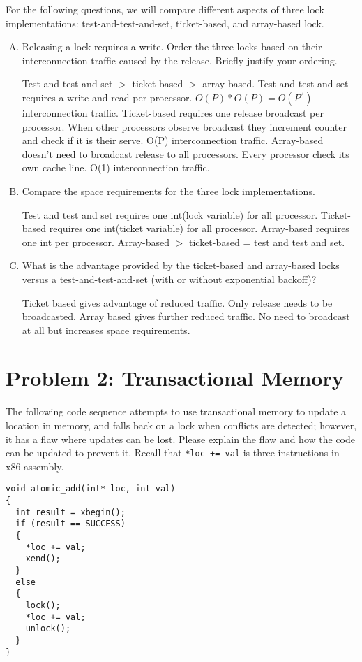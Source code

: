 \documentclass[11pt]{article}
\newenvironment{choice}{\begin{enumerate}[A.]}{\end{enumerate}}
\newenvironment{answer}{\begin{minipage}[c][1.5in]{\textwidth}}{\end{minipage}}
\begin{document}
For the following questions, we will compare different aspects of three
lock implementations:
test-and-test-and-set, ticket-based, and array-based lock.
\begin{choice}
\item Releasing a lock requires a write.  Order the three locks based on their
interconnection traffic caused by the release.  Briefly justify your ordering.

\begin{answer}
Test-and-test-and-set $>$ ticket-based $>$ array-based.
Test and test and set requires a write and read per processor.
$O(P) * O(P) = O(P^2)$ interconnection traffic.
Ticket-based requires one release broadcast per processor.
When other processors observe broadcast they increment counter and check if it is their serve.
O(P) interconnection traffic.
Array-based doesn't need to broadcast release to all processors. 
Every processor check its own cache line.
O(1) interconnection traffic.
\end{answer}

\item Compare the space requirements for the three lock implementations.

\begin{answer}
Test and test and set requires one int(lock variable) for all processor.
Ticket-based requires one int(ticket variable) for all processor.
Array-based requires  one int per processor. 
Array-based $>$ ticket-based = test and test and set.
\end{answer}
\item What is the advantage provided by the ticket-based and array-based locks versus a 
test-and-test-and-set (with or without exponential backoff)?

\begin{answer}
Ticket based gives advantage of reduced traffic. Only release needs to be broadcasted.
Array based gives further reduced traffic. No need to broadcast at all but increases space requirements.
\end{answer}
\end{choice}
\newpage 

\section*{Problem 2: Transactional Memory}

The following code sequence attempts to use transactional memory to update
a location in memory, and falls back on a lock when conflicts are detected; however,
it has a flaw where updates can be lost.  Please
explain the flaw and how the code can be updated to prevent it.  Recall that \verb!*loc += val!
is three instructions in x86 assembly.
\begin{verbatim}
void atomic_add(int* loc, int val)
{
  int result = xbegin();
  if (result == SUCCESS)
  {
    *loc += val;
    xend();
  }
  else
  {
    lock();
    *loc += val;
    unlock();
  }
}
\end{verbatim}
\end{document}
